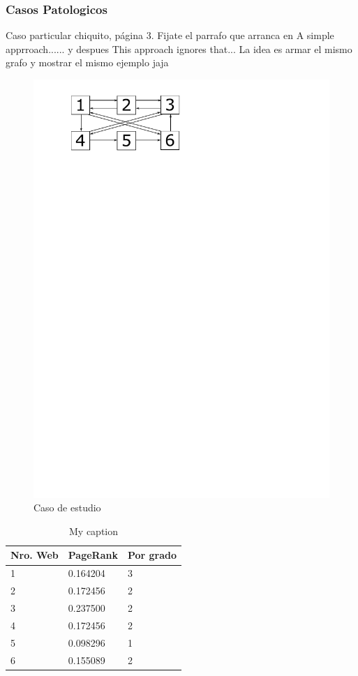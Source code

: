 \subsubsection{Casos Patologicos}
Caso particular chiquito, página 3. Fijate el parrafo que arranca en A simple apprroach...... y despues This approach ignores that... La idea es armar el mismo grafo y mostrar el mismo ejemplo jaja

\begin{figure}[H]
\centering
\includegraphics[scale=0.7]{images/drawing.pdf}
\caption{Caso de estudio}
\label{casoEst}
\end{figure}

\begin{table}[H]
\centering
\caption{My caption}
\label{my-label}
\begin{tabular}{lll}
\hline
Nro. Web & PageRank & Por grado \\ \hline
1        & 0.164204 & 3         \\
2        & 0.172456 & 2         \\
3        & 0.237500 & 2         \\
4        & 0.172456 & 2         \\
5        & 0.098296 & 1         \\
6        & 0.155089 & 2         \\ \hline
\end{tabular}
\end{table}